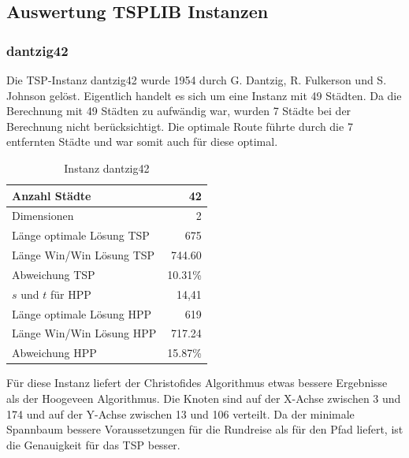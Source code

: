 \documentclass[11pt,a4paper]{article}
\begin{document}
\subsection{Auswertung TSPLIB Instanzen}

\subsubsection{dantzig42}
Die TSP-Instanz dantzig42 wurde 1954 durch G. Dantzig, R. Fulkerson und S. Johnson gelöst. Eigentlich handelt es sich um eine Instanz mit 49 Städten. Da die Berechnung mit 49 Städten zu aufwändig war, wurden 7 Städte bei der Berechnung nicht berücksichtigt. Die optimale Route führte durch die 7 entfernten Städte und war somit auch für diese optimal.

        \begin{table}[H]
                \centering
                \begin{tabular}{| l | r |}
                    \hline
                        Anzahl Städte               & 42            \\ \hline
                        Dimensionen                 & 2             \\ \hline
                        Länge optimale Lösung TSP   & 675           \\ \hline
                        Länge Win/Win Lösung  TSP   & 744.60        \\ \hline
                        Abweichung TSP              & 10.31\%       \\ \hline
                        $s$ und $t$ für HPP         & 14,41         \\ \hline
                        Länge optimale Lösung HPP   & 619           \\ \hline
                        Länge Win/Win Lösung  HPP   & 717.24        \\ \hline
                        Abweichung HPP              & 15.87\%       \\ \hline
                \end{tabular}
                \caption{Instanz dantzig42}
                \label{tab:dantzig42}
        \end{table}

Für diese Instanz liefert der Christofides Algorithmus etwas bessere Ergebnisse als der Hoogeveen Algorithmus. Die Knoten sind auf der X-Achse zwischen 3 und 174 und auf der Y-Achse zwischen 13 und 106 verteilt. Da der minimale Spannbaum bessere Voraussetzungen für die Rundreise als für den Pfad liefert, ist die Genauigkeit für das TSP besser.
\end{document}
